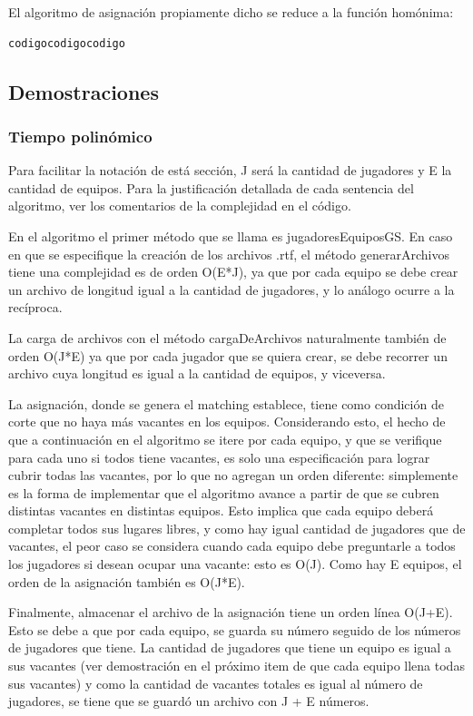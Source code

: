 \documentclass[article,a4paper]{article}
\begin{document}
El algoritmo de asignación propiamente dicho se reduce a la función homónima:

\begin{verbatim}
codigocodigocodigo
\end{verbatim}

\subsection{Demostraciones}

\subsubsection{Tiempo polinómico}

Para facilitar la notación de está sección, J será la cantidad de jugadores y E la cantidad de equipos. Para la justificación detallada de cada sentencia del algoritmo, ver los comentarios de la complejidad en el código.

En el algoritmo el primer método que se llama es jugadoresEquiposGS. En caso en que se especifique la creación de los archivos .rtf, el método generarArchivos tiene una complejidad es de orden O(E*J), ya que por cada equipo se debe crear un archivo de longitud igual a la cantidad de jugadores, y lo análogo ocurre a la recíproca.

La carga de archivos con el método cargaDeArchivos naturalmente también de orden O(J*E) ya que por cada jugador que se quiera crear, se debe recorrer un archivo cuya longitud es igual a la cantidad de equipos, y viceversa.

La asignación, donde se genera el matching establece, tiene como condición de corte que no haya más vacantes en los equipos. Considerando esto, el hecho de que a continuación en el algoritmo se itere por cada equipo, y que se verifique para cada uno si todos tiene vacantes, es solo una especificación para lograr cubrir todas las vacantes, por lo que no agregan un orden diferente: simplemente es la forma de implementar que el algoritmo avance a partir de que se cubren distintas vacantes en distintas equipos. Esto implica que cada equipo deberá completar todos sus lugares libres, y como hay igual cantidad de jugadores que de vacantes, el peor caso se considera cuando cada equipo debe preguntarle a todos los jugadores si desean ocupar una vacante: esto es O(J). Como hay E equipos, el orden de la asignación también es O(J*E).

Finalmente, almacenar el archivo de la asignación tiene un orden línea O(J+E). Esto se debe a que por cada equipo, se guarda su número seguido de los números de jugadores que tiene. La cantidad de jugadores que tiene un equipo es igual a sus vacantes (ver demostración en el próximo item de que cada equipo llena todas sus vacantes) y como la cantidad de vacantes totales es igual al número de jugadores, se tiene que se guardó un archivo con J + E números.
\end{document}
